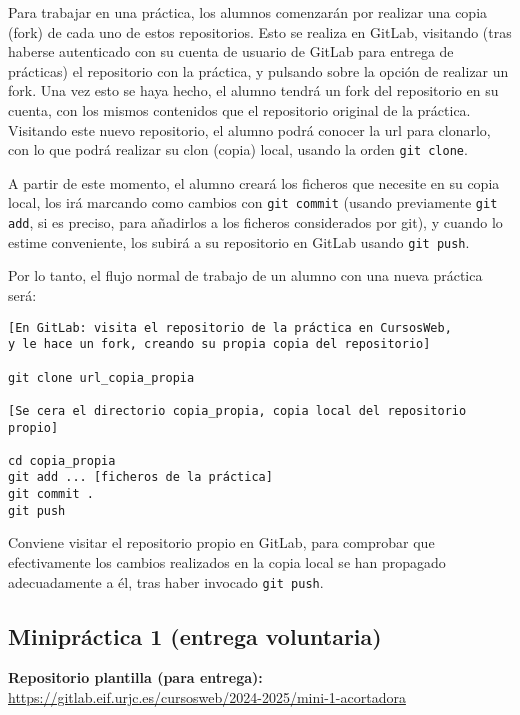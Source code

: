Para trabajar en una práctica, los alumnos comenzarán por realizar una copia (fork) de cada uno de estos repositorios. Esto se realiza en GitLab, visitando (tras haberse autenticado con su cuenta de usuario de GitLab para entrega de prácticas) el repositorio con la práctica, y pulsando sobre la opción de realizar un fork. Una vez esto se haya hecho, el alumno tendrá un fork del repositorio en su cuenta, con los mismos contenidos que el repositorio original de la práctica. Visitando este nuevo repositorio, el alumno podrá conocer la url para clonarlo, con lo que podrá realizar su clon (copia) local, usando la orden \verb|git clone|.

A partir de este momento, el alumno creará los ficheros que necesite en su copia local, los irá marcando como cambios con \verb|git commit| (usando previamente \verb|git add|, si es preciso, para añadirlos a los ficheros considerados por git), y cuando lo estime conveniente, los subirá a su repositorio en GitLab usando \verb|git push|.

Por lo tanto, el flujo normal de trabajo de un alumno con una nueva práctica será:

\begin{verbatim}
[En GitLab: visita el repositorio de la práctica en CursosWeb,
y le hace un fork, creando su propia copia del repositorio]

git clone url_copia_propia

[Se cera el directorio copia_propia, copia local del repositorio propio]

cd copia_propia
git add ... [ficheros de la práctica]
git commit .
git push
\end{verbatim}

Conviene visitar el repositorio propio en GitLab, para comprobar que efectivamente los cambios realizados en la copia local se han propagado adecuadamente a él, tras haber invocado \verb|git push|.

\subsection{Minipráctica 1 (entrega voluntaria)}
\label{subsec:minipractica-1-2025}

\textbf{Repositorio plantilla (para entrega):} \\
\url{https://gitlab.eif.urjc.es/cursosweb/2024-2025/mini-1-acortadora}

